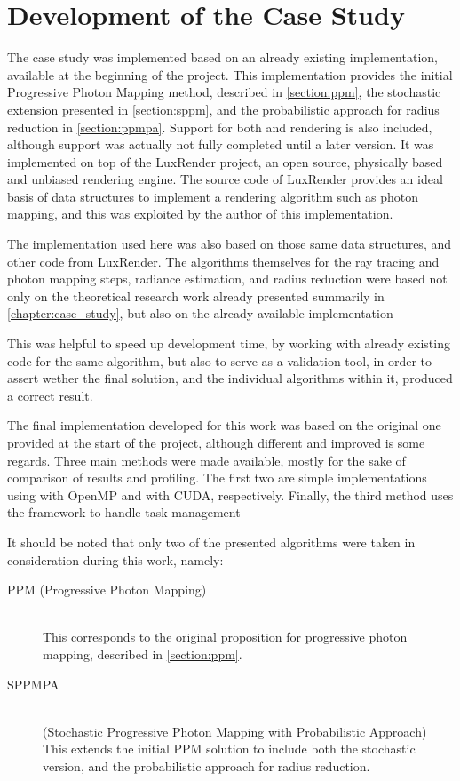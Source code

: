 \documentclass[main.tex]{subfiles}
\begin{document}
\chapter{Development of the Case Study} \label{chapter:impl}

The case study was implemented based on an already existing implementation, available at the beginning of the project. This implementation provides the initial Progressive Photon Mapping method, described in \cref{section:ppm}, the stochastic extension presented in \cref{section:sppm}, and the probabilistic approach for radius reduction in \cref{section:ppmpa}. Support for both \cpu and \cuda rendering is also included, although \cuda support was actually not fully completed until a later version. It was implemented on top of the LuxRender project, an open source, physically based and unbiased rendering engine. The source code of LuxRender provides an ideal basis of data structures to implement a rendering algorithm such as photon mapping, and this was exploited by the author of this implementation.

The implementation used here was also based on those same data structures, and other code from LuxRender. The algorithms themselves for the ray tracing and photon mapping steps, radiance estimation, and radius reduction were based not only on the theoretical research work already presented summarily in \cref{chapter:case_study}, but also on the already available implementation

This was helpful to speed up development time, by working with already existing code for the same algorithm, but also to serve as a validation tool, in order to assert wether the final solution, and the individual algorithms within it, produced a correct result.

The final implementation developed for this work was based on the original one provided at the start of the project, although different and improved is some regards. Three main methods were made available, mostly for the sake of comparison of results and profiling. The first two are simple implementations using \cpus with \acs{OpenMP} and \gpus with \acs{CUDA}, respectively. Finally, the third method uses the \starpu framework to handle task management

It should be noted that only two of the presented algorithms were taken in consideration during this work, namely:

\begin{description}
\item[PPM (Progressive Photon Mapping)] \hfill \\
  This corresponds to the original proposition for progressive photon mapping, described in \cref{section:ppm}.

\item[SPPMPA] \hfill \\
  (Stochastic Progressive Photon Mapping with Probabilistic Approach) This extends the initial PPM solution to include both the stochastic version, and the probabilistic approach for radius reduction.
\end{description}
\end{document}
